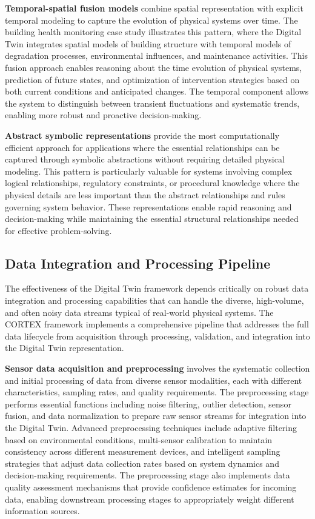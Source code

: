 \textbf{Temporal-spatial fusion models} combine spatial representation with explicit temporal modeling to capture the evolution of physical systems over time. The building health monitoring case study illustrates this pattern, where the Digital Twin integrates spatial models of building structure with temporal models of degradation processes, environmental influences, and maintenance activities. This fusion approach enables reasoning about the time evolution of physical systems, prediction of future states, and optimization of intervention strategies based on both current conditions and anticipated changes. The temporal component allows the system to distinguish between transient fluctuations and systematic trends, enabling more robust and proactive decision-making.

\textbf{Abstract symbolic representations} provide the most computationally efficient approach for applications where the essential relationships can be captured through symbolic abstractions without requiring detailed physical modeling. This pattern is particularly valuable for systems involving complex logical relationships, regulatory constraints, or procedural knowledge where the physical details are less important than the abstract relationships and rules governing system behavior. These representations enable rapid reasoning and decision-making while maintaining the essential structural relationships needed for effective problem-solving.

\subsection{Data Integration and Processing Pipeline}

The effectiveness of the Digital Twin framework depends critically on robust data integration and processing capabilities that can handle the diverse, high-volume, and often noisy data streams typical of real-world physical systems. The CORTEX framework implements a comprehensive pipeline that addresses the full data lifecycle from acquisition through processing, validation, and integration into the Digital Twin representation.

\textbf{Sensor data acquisition and preprocessing} involves the systematic collection and initial processing of data from diverse sensor modalities, each with different characteristics, sampling rates, and quality requirements. The preprocessing stage performs essential functions including noise filtering, outlier detection, sensor fusion, and data normalization to prepare raw sensor streams for integration into the Digital Twin. Advanced preprocessing techniques include adaptive filtering based on environmental conditions, multi-sensor calibration to maintain consistency across different measurement devices, and intelligent sampling strategies that adjust data collection rates based on system dynamics and decision-making requirements. The preprocessing stage also implements data quality assessment mechanisms that provide confidence estimates for incoming data, enabling downstream processing stages to appropriately weight different information sources.

